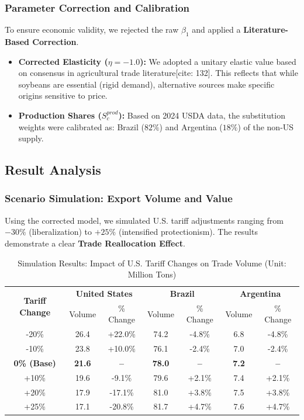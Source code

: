 \documentclass{apmcmthesis}
\begin{document}
\subsubsection{Parameter Correction and Calibration}
To ensure economic validity, we rejected the raw $\beta_1$ and applied a \textbf{Literature-Based Correction}.
\begin{itemize}
    \item \textbf{Corrected Elasticity ($\eta = -1.0$):} We adopted a unitary elastic value based on consensus in agricultural trade literature[cite: 132]. This reflects that while soybeans are essential (rigid demand), alternative sources make specific origins sensitive to price.
    \item \textbf{Production Shares ($S_c^{prod}$):} Based on 2024 USDA data, the substitution weights were calibrated as: Brazil ($82\%$) and Argentina ($18\%$) of the non-US supply.
\end{itemize}

\subsection{Result Analysis}

\subsubsection{Scenario Simulation: Export Volume and Value}
Using the corrected model, we simulated U.S. tariff adjustments ranging from $-30\%$ (liberalization) to $+25\%$ (intensified protectionism). The results demonstrate a clear \textbf{Trade Reallocation Effect}.

\begin{table}[H]
\centering
\caption{Simulation Results: Impact of U.S. Tariff Changes on Trade Volume (Unit: Million Tons)}
\begin{tabular}{c|cc|cc|cc}
\hline
\multirow{2}{*}{\textbf{Tariff Change}} & \multicolumn{2}{c|}{\textbf{United States}} & \multicolumn{2}{c|}{\textbf{Brazil}} & \multicolumn{2}{c}{\textbf{Argentina}} \\
& Volume & \% Change & Volume & \% Change & Volume & \% Change \\
\hline
-20\% & 26.4 & +22.0\% & 74.2 & -4.8\% & 6.8 & -4.8\% \\
-10\% & 23.8 & +10.0\% & 76.1 & -2.4\% & 7.0 & -2.4\% \\
\textbf{0\% (Base)} & \textbf{21.6} & \textbf{--} & \textbf{78.0} & \textbf{--} & \textbf{7.2} & \textbf{--} \\
+10\% & 19.6 & -9.1\% & 79.6 & +2.1\% & 7.4 & +2.1\% \\
+20\% & 17.9 & -17.1\% & 81.0 & +3.8\% & 7.5 & +3.8\% \\
+25\% & 17.1 & -20.8\% & 81.7 & +4.7\% & 7.6 & +4.7\% \\
\hline
\end{tabular}
\label{tab:simulation_results}
\end{table}
\end{document}
